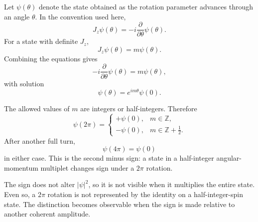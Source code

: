 \begin{classroomqa}
\end{classroomqa}


Let \(\psi(\theta)\) denote the state obtained as the rotation parameter advances through an angle \(\theta\). In the convention used here,
\begin{equation}
J_z\psi(\theta)
=
-i\frac{\partial}{\partial\theta}\psi(\theta).
\end{equation}
For a state with definite \(J_z\),
\begin{equation}
J_z\psi(\theta)=m\psi(\theta).
\end{equation}
Combining the equations gives
\begin{equation}
-i\frac{\partial}{\partial\theta}\psi(\theta)
=
m\psi(\theta),
\end{equation}
with solution
\begin{equation}
\psi(\theta)=e^{im\theta}\psi(0).
\end{equation}

The allowed values of \(m\) are integers or half-integers. Therefore
\begin{equation}
\psi(2\pi)
=
\begin{cases}
+\psi(0), & m\in\mathbb Z,\\[4pt]
-\psi(0), & m\in\mathbb Z+\tfrac12.
\end{cases}
\end{equation}
After another full turn,
\begin{equation}
\psi(4\pi)=\psi(0)
\end{equation}
in either case. This is the second minus sign: a state in a half-integer angular-momentum multiplet changes sign under a \(2\pi\) rotation.

The sign does not alter \(\lvert\psi\rvert^2\), so it is not visible when it multiplies the entire state. Even so, a \(2\pi\) rotation is not represented by the identity on a half-integer-spin state. The distinction becomes observable when the sign is made relative to another coherent amplitude.

